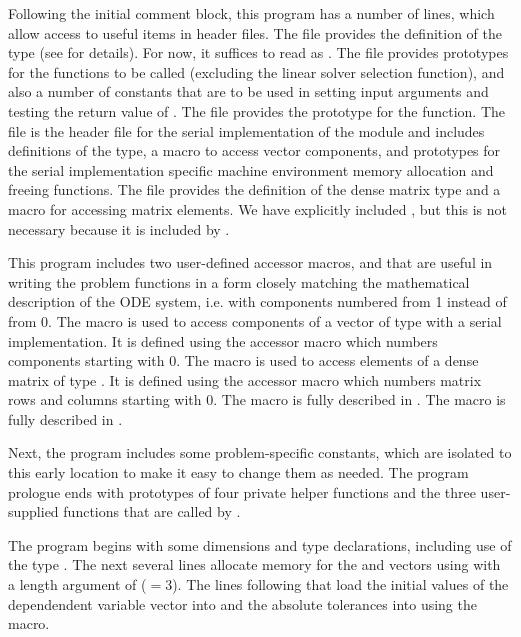 Following the initial comment block, this program has a number
of  lines, which allow access to useful items in {\cvode}
header files.  The  file provides the definition of the
type  (see  for details).  
For now, it suffices to read  as .
The  file provides prototypes for the {\cvode}
functions to be called (excluding the linear solver selection
function), and also a number of constants that are to be used in
setting input arguments and testing the return value of .
The  file provides the prototype for the  function.
The  file is the header file for the serial
implementation of the {\nvector} module and includes definitions of the 
 type, a macro to access vector components, and prototypes 
for the serial implementation specific machine environment memory allocation
and freeing functions.
The  file provides the definition of the dense
matrix type  and a macro for accessing matrix elements.
We have explicitly included , but this is not necessary because 
it is included by .

This program includes two user-defined accessor macros,  and
 that are useful in writing the problem functions in a form
closely matching the mathematical description of the ODE system,
i.e. with components numbered from 1 instead of from 0.  The 
macro is used to access components of a vector of type 
with a serial implementation.  It is defined using the {\nvecs}
accessor macro  which numbers components starting with
0. The  macro is used to access elements of a dense matrix of
type . It is defined using the {\dense} accessor macro
 which numbers matrix rows and columns starting with
0. 
The macro  is fully described in .
The macro  is fully described in .

Next, the program includes some problem-specific constants, which are
isolated to this early location to make it easy to change them as needed.  
The program prologue ends with prototypes of four private helper
functions and the three user-supplied functions that are called by {\cvode}.

The  program begins with some dimensions and type declarations,
including use of the type .  The next several lines
allocate memory for the  and  vectors using
 with a length argument of  ($= 3$). The
lines following that load the initial values of the dependendent
variable vector into  and the absolute tolerances into 
using the  macro.

